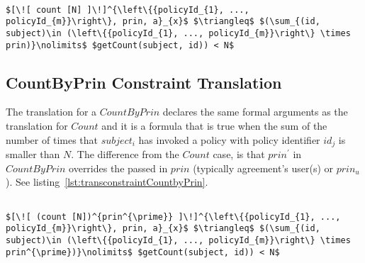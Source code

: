 \lstset{mathescape, language=AST}  
\begin{lstlisting}[frame=single, caption={Constraint Translation {$\colon$} Count},label={lst:transconstraintCount}]

$[\![ count [N] ]\!]^{\left\{{policyId_{1}, ..., policyId_{m}}\right\}, prin, a}_{x}$ $\triangleq$ $(\sum_{(id, subject)\in (\left\{{policyId_{1}, ..., policyId_{m}}\right\} \times prin)}\nolimits$ $getCount(subject, id)) < N$ 
\end{lstlisting}


\subsection{CountByPrin Constraint Translation}
The translation for a $CountByPrin$ declares the same formal arguments as the translation for $Count$ and it is a formula that is true when the sum of the number of times that $subject_{i}$ has invoked a policy with policy identifier $id_{j}$ is smaller than $N$. The difference from the $Count$ case, is that $prin^{\prime}$ in $CountByPrin$ overrides the passed in $prin$ (typically agreement's user(s) or $prin_{u}$). See listing~\ref{lst:transconstraintCountbyPrin}.


\lstset{mathescape, language=AST}  
\begin{lstlisting}[frame=single, caption={Constraint Translation {$\colon$} Count by Principal},label={lst:transconstraintCountbyPrin}]

$[\![ (count [N])^{prin^{\prime}} ]\!]^{\left\{{policyId_{1}, ..., policyId_{m}}\right\}, prin, a}_{x}$ $\triangleq$ $(\sum_{(id, subject)\in (\left\{{policyId_{1}, ..., policyId_{m}}\right\} \times prin^{\prime})}\nolimits$ $getCount(subject, id)) < N$ 
\end{lstlisting}


